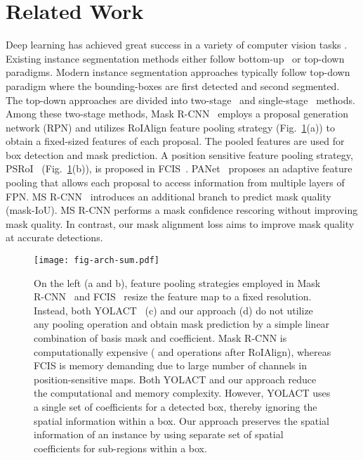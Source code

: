 \documentclass[runningheads]{llncs}
\begin{document}
\section{Related Work} \label{related_work}
Deep learning has achieved great success in a variety of computer vision tasks \cite{Girshick_RCNN_CVPR_2014,Cholakkal_OCIS_CVPR_2019,Wang_RFHS_ICCV_2019,Pang_MGAN_ICCV_2019,Wu_TFAN_CVPR_2020,Wang_IPNet_CVPR_2020,AR_TIP_2015,Jiang_DAML_TMM_2020,cvpr19uel,arxiv20reidsurvey}. Existing instance segmentation methods either follow bottom-up~\cite{Arnab_PIS_CVPR_2017,Kirillov_InstanceCut_CVPR_2017,Liu_SGN_ICCV_2017,Neven_OSECB_CVPR_2019,Gao_SSAP_ICCV_2019} or top-down~\cite{He_MaskRCNN_ICCV_2017,Liu_PANet_CVPR_2018,Chen_HTC_CVPR_2019,Bolya_YOLACT_ICCV_2019,Peng_DeepSnake_CVPR_2020} paradigms. Modern instance segmentation approaches typically follow top-down paradigm 
where the bounding-boxes are first detected and second segmented. The top-down approaches are divided into two-stage~\cite{He_MaskRCNN_ICCV_2017,Liu_PANet_CVPR_2018,Chen_HTC_CVPR_2019,Huang_MSRCNN_CVPR_2019,Fang_InstaBoost_ICCV_2019} and single-stage~\cite{Dai_InstanceFCN_ECCV_2016,Xu_ESE_ICCV_2019,Bolya_YOLACT_ICCV_2019,Wang_RDSNet_AAAI_2020,Peng_DeepSnake_CVPR_2020} methods.
Among these two-stage methods, Mask R-CNN~\cite{He_MaskRCNN_ICCV_2017} employs a proposal generation network (RPN) and utilizes RoIAlign feature pooling strategy (Fig.~\ref{fig:progress}(a)) to obtain a fixed-sized features of each proposal. The pooled features are used for box detection and mask prediction. A position sensitive feature pooling strategy, PSRoI~\cite{Dai_RFCN_NIPS_2016} (Fig.~\ref{fig:progress}(b)), is proposed in FCIS~\cite{Li_FCIS_CVPR_2017}. PANet~\cite{Liu_PANet_CVPR_2018} proposes an adaptive feature pooling that allows each proposal to access information from multiple layers of FPN. MS R-CNN~\cite{Huang_MSRCNN_CVPR_2019} introduces an additional branch to predict mask quality (mask-IoU). MS R-CNN  performs a mask confidence rescoring without improving mask quality. In contrast, our mask alignment loss  aims to improve mask quality at accurate detections.


\begin{figure}[t!]
\centering
\texttt{[image: fig-arch-sum.pdf]} \caption{On the left (a and b), feature pooling strategies employed in Mask R-CNN~\cite{He_MaskRCNN_ICCV_2017} and FCIS~\cite{Li_FCIS_CVPR_2017} resize the feature map to a fixed resolution. Instead, both YOLACT~\cite{Bolya_YOLACT_ICCV_2019} (c) and our approach (d) do not utilize any pooling operation and obtain mask prediction by a simple linear combination of basis mask and coefficient. 
Mask R-CNN is computationally expensive ( and  operations after RoIAlign), whereas 
FCIS is memory demanding due to large number of channels in position-sensitive maps. Both YOLACT and our approach reduce the computational and memory complexity. However, YOLACT uses a single set of coefficients for a detected box, thereby ignoring the spatial information within a box. Our approach preserves the spatial information of an instance by using separate set of spatial coefficients for   sub-regions within a box.}\label{fig:progress}
\end{figure}
\end{document}
